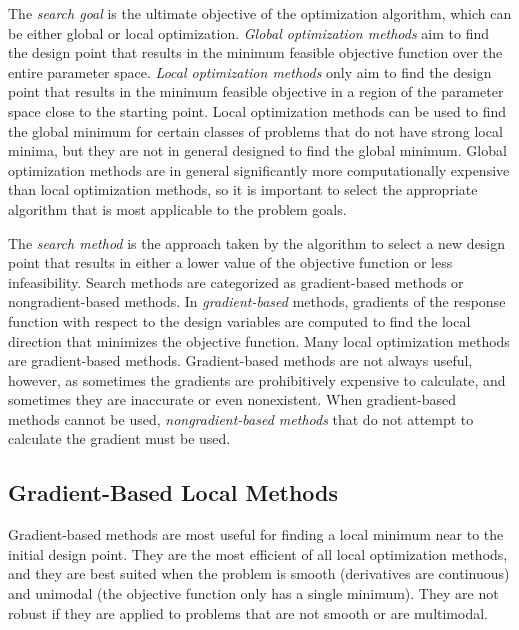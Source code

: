 The \textit{search goal} is the ultimate objective of the optimization algorithm, which can be either global or local optimization.
\textit{Global optimization methods} aim to find the design point that results in the minimum feasible objective function over the entire parameter space.
\textit{Local optimization methods} only aim to find the design point that results in the minimum feasible objective in a region of the parameter space close to the starting point.
Local optimization methods can be used to find the global minimum for certain classes of problems that do not have strong local minima, but they are not in general designed to find the global minimum.
Global optimization methods are in general significantly more computationally expensive than local optimization methods, so it is important to select the appropriate algorithm that is most applicable to the problem goals.

The \textit{search method} is the approach taken by the algorithm to select a new design point that results in either a lower value of the objective function or less infeasibility.
Search methods are categorized as gradient-based methods or nongradient-based methods.
In \textit{gradient-based} methods, gradients of the response function with respect to the design variables are computed to find the local direction that minimizes the objective function.
Many local optimization methods are gradient-based methods.
Gradient-based methods are not always useful, however, as sometimes the gradients are prohibitively expensive to calculate, and sometimes they are inaccurate or even nonexistent.
When gradient-based methods cannot be used, \textit{nongradient-based methods} that do not attempt to calculate the gradient must be used.

\subsection{Gradient-Based Local Methods}
\label{sec:bg:opt:grad}

Gradient-based methods are most useful for finding a local minimum near to the initial design point.
They are the most efficient of all local optimization methods, and they are best suited when the problem is smooth (derivatives are continuous) and unimodal (the objective function only has a single minimum).
They are not robust if they are applied to problems that are not smooth or are multimodal.

